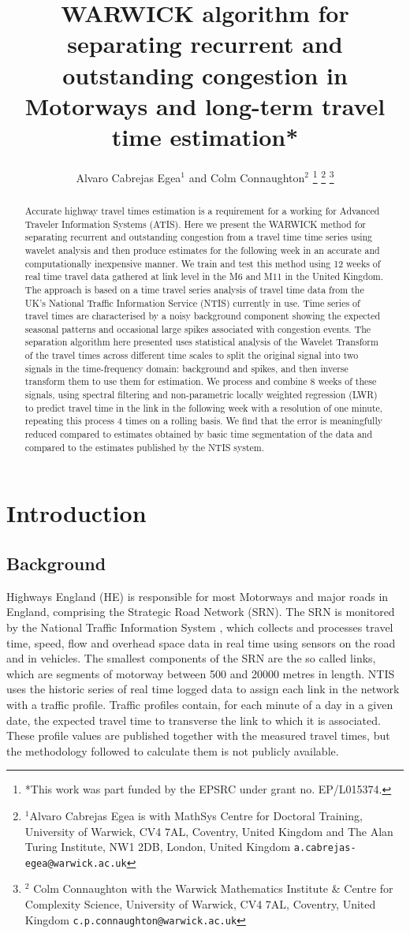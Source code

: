 \documentclass[a4paper, 10pt, conference]{ieeeconf}      %
\title{\LARGE \bf
WARWICK algorithm for separating recurrent and outstanding congestion in Motorways and long-term travel time estimation*
}
\author{Alvaro Cabrejas Egea$^{1}$ and Colm Connaughton$^{2}$%
\thanks{*This work was part funded by the EPSRC under grant no. EP/L015374.}%
\thanks{$^{1}$Alvaro Cabrejas Egea is with MathSys Centre for Doctoral Training, University of Warwick, CV4 7AL, Coventry, United Kingdom and The Alan Turing Institute, NW1 2DB, London, United Kingdom
        {\tt\small a.cabrejas-egea@warwick.ac.uk}}%
\thanks{$^{2}$ Colm Connaughton with the Warwick Mathematics Institute \& Centre for Complexity Science, University of Warwick,
        CV4 7AL, Coventry, United Kingdom
        {\tt\small c.p.connaughton@warwick.ac.uk}}%
}
\begin{document}
\maketitle
\thispagestyle{empty}
\pagestyle{empty}


\begin{abstract}
Accurate highway travel times estimation is a requirement for a working for Advanced Traveler Information Systems (ATIS).
Here we present the WARWICK method for separating recurrent and outstanding congestion from a travel time time series using wavelet analysis and then produce estimates for the following week in an accurate and computationally inexpensive manner. 
We train and test this method using 12 weeks of real time travel data gathered at link level in the M6 and M11 in the United Kingdom.
The approach is based on a time travel series analysis of travel time data from the UK's National Traffic Information Service (NTIS) currently in use.
Time series of travel times are characterised by a noisy background component showing the expected seasonal patterns and occasional large spikes associated with congestion events.
The separation algorithm here presented uses statistical analysis of the Wavelet Transform of the travel times across different time scales to split the original signal into two signals in the time-frequency domain: background and spikes, and then inverse transform them to use them for estimation.
We process and combine 8 weeks of these signals, using spectral filtering and non-parametric locally weighted regression (LWR) to predict travel time in the link in the following week with a resolution of one minute, repeating this process 4 times on a rolling basis.
We find that the error is meaningfully reduced compared to estimates obtained by basic time segmentation of the data and compared to the estimates published by the NTIS system.
\end{abstract}

\section{Introduction} \label{Introduction}
\subsection{Background} \label{Background}
Highways England (HE) is responsible for most Motorways and major roads in England, comprising the Strategic Road Network (SRN).
The SRN is monitored by the National Traffic Information System \cite{NTIS}, which collects and processes travel time, speed, flow and overhead space data in real time using sensors on the road and in vehicles.
The smallest components of the SRN are the so called links, which are segments of motorway between 500 and 20000 metres in length.
NTIS uses the historic series of real time logged data to assign each link in the network with a traffic profile.
Traffic profiles contain, for each minute of a day in a given date, the expected travel time to transverse the link to which it is associated. 
These profile values are published together with the measured travel times, but the methodology followed to calculate them is not publicly available.
\end{document}
